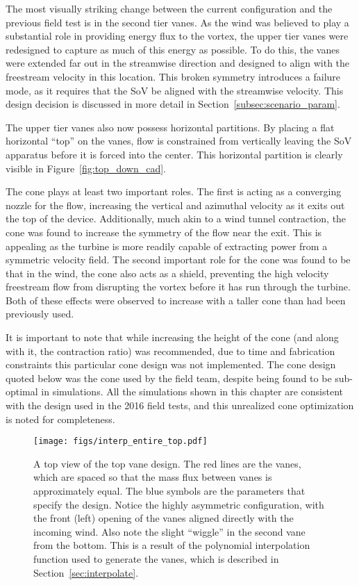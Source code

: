 The most visually striking change between the current configuration and
the previous field test is in the second tier vanes. As the wind was
believed to play a substantial role in providing energy flux to the
vortex, the upper tier vanes were redesigned to capture as much of this
energy as possible. To do this, the vanes were extended far out in the
streamwise direction and designed to align with the freestream velocity
in this location. This broken symmetry introduces a failure mode, as it
requires that the SoV be aligned with the streamwise velocity. This
design decision is discussed in more detail in
Section~\ref{subsec:scenario_param}. 

The upper tier vanes also now possess horizontal partitions. By placing
a flat horizontal ``top'' on the vanes, flow is constrained from
vertically leaving the SoV apparatus before it is forced into the
center. This horizontal partition is clearly visible in
Figure~\ref{fig:top_down_cad}.   

The cone plays at least two important roles. The first is acting as a
converging nozzle for the flow, increasing the vertical and azimuthal
velocity as it exits out the top of the device. Additionally, much akin
to a wind tunnel contraction, the cone was found to increase the
symmetry of the flow near the exit. This is appealing as the turbine is
more readily capable of extracting power from a symmetric velocity
field. The second important role for the cone was found to be that in
the wind, the cone also acts as a shield, preventing the high velocity
freestream flow from disrupting the vortex before it has run through the
turbine. Both of these effects were observed to increase with a taller
cone than had been previously used.

It is important to note that while increasing the height of the cone
(and along with it, the contraction ratio) was recommended, due to
time and fabrication constraints this particular cone design was not
implemented. The cone design quoted below was the cone used by
the field team, despite being found to be sub-optimal in
simulations. All the simulations shown in this chapter are consistent
with the design used in the 2016 field tests, and this unrealized cone
optimization is noted for completeness.

 \begin{figure}[!htb]
  \begin{center}
   \texttt{[image: figs/interp\_entire\_top.pdf]}
   \caption{A top view of the top vane design. The red lines are the
     vanes, which are spaced so that the mass flux between vanes is
     approximately equal. The blue symbols are the parameters that
     specify the design. Notice the highly asymmetric configuration,
     with the front (left) opening of the vanes aligned directly with
     the incoming wind. Also note the slight ``wiggle'' in the second
   vane from the bottom. This is a result of the polynomial
   interpolation function used to generate the vanes, which is described
   in Section~\ref{sec:interpolate}.} 
   \label{fig:top_design}
  \end{center}
 \end{figure}

